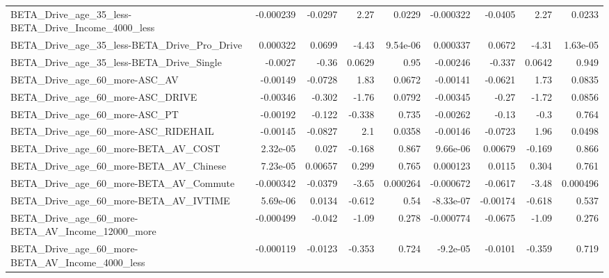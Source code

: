 \begin{tabular}{lrrrrrrrr}
BETA\_Drive\_age\_35\_less-BETA\_Drive\_Income\_4000\_less &   -0.000239 &      -0.0297 &      2.27 &   0.0229 &  -0.000322 &     -0.0405 &         2.27 &        0.0233 \\
BETA\_Drive\_age\_35\_less-BETA\_Drive\_Pro\_Drive        &    0.000322 &       0.0699 &     -4.43 & 9.54e-06 &   0.000337 &      0.0672 &        -4.31 &      1.63e-05 \\
BETA\_Drive\_age\_35\_less-BETA\_Drive\_Single           &     -0.0027 &        -0.36 &    0.0629 &     0.95 &   -0.00246 &      -0.337 &       0.0642 &         0.949 \\
BETA\_Drive\_age\_60\_more-ASC\_AV                      &    -0.00149 &      -0.0728 &      1.83 &   0.0672 &   -0.00141 &     -0.0621 &         1.73 &        0.0835 \\
BETA\_Drive\_age\_60\_more-ASC\_DRIVE                   &    -0.00346 &       -0.302 &     -1.76 &   0.0792 &   -0.00345 &       -0.27 &        -1.72 &        0.0856 \\
BETA\_Drive\_age\_60\_more-ASC\_PT                      &    -0.00192 &       -0.122 &    -0.338 &    0.735 &   -0.00262 &       -0.13 &         -0.3 &         0.764 \\
BETA\_Drive\_age\_60\_more-ASC\_RIDEHAIL                &    -0.00145 &      -0.0827 &       2.1 &   0.0358 &   -0.00146 &     -0.0723 &         1.96 &        0.0498 \\
BETA\_Drive\_age\_60\_more-BETA\_AV\_COST                &    2.32e-05 &        0.027 &    -0.168 &    0.867 &   9.66e-06 &     0.00679 &       -0.169 &         0.866 \\
BETA\_Drive\_age\_60\_more-BETA\_AV\_Chinese             &    7.23e-05 &      0.00657 &     0.299 &    0.765 &   0.000123 &      0.0115 &        0.304 &         0.761 \\
BETA\_Drive\_age\_60\_more-BETA\_AV\_Commute             &   -0.000342 &      -0.0379 &     -3.65 & 0.000264 &  -0.000672 &     -0.0617 &        -3.48 &      0.000496 \\
BETA\_Drive\_age\_60\_more-BETA\_AV\_IVTIME              &    5.69e-06 &       0.0134 &    -0.612 &     0.54 &  -8.33e-07 &    -0.00174 &       -0.618 &         0.537 \\
BETA\_Drive\_age\_60\_more-BETA\_AV\_Income\_12000\_more   &   -0.000499 &       -0.042 &     -1.09 &    0.278 &  -0.000774 &     -0.0675 &        -1.09 &         0.276 \\
BETA\_Drive\_age\_60\_more-BETA\_AV\_Income\_4000\_less    &   -0.000119 &      -0.0123 &    -0.353 &    0.724 &   -9.2e-05 &     -0.0101 &       -0.359 &         0.719 \\

\end{tabular}
